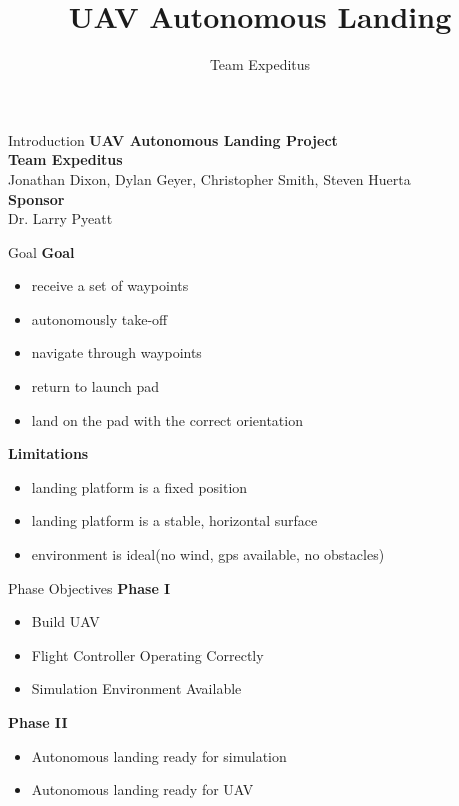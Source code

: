 \documentclass[11pt]{beamer}
\author{Team Expeditus}
\title{UAV Autonomous Landing}
\institute{Dept. of Computer Science, SDSMT}
\begin{document}
\begin{frame}
\titlepage
\end{frame}


\begin{frame}{Introduction}
\textbf{UAV Autonomous Landing Project}\\
\vspace{12mm}
\textbf{Team Expeditus}\\
Jonathan Dixon, Dylan Geyer, Christopher Smith, Steven Huerta\\ 
\vspace{6mm}
\textbf{Sponsor}\\
Dr. Larry Pyeatt\\
\end{frame}

\begin{frame}{Goal}
\textbf{Goal}\\
\begin{itemize}
\item receive a set of waypoints
\item autonomously take-off
\item navigate through waypoints
\item return to launch pad
\item land on the pad with the correct orientation
\end{itemize}
\vspace{6mm}
\textbf{Limitations}\\
\begin{itemize}
\item landing platform is a fixed position
\item landing platform is a stable, horizontal surface
\item environment is ideal(no wind, gps available, no obstacles)
\end{itemize}

\end{frame}

\begin{frame}{Phase Objectives}
\textbf{Phase I}
\begin{itemize}
\item Build UAV 
\item Flight Controller Operating Correctly
\item Simulation Environment Available
\end{itemize}
\vspace{5mm}
\textbf{Phase II}
\begin{itemize}
\item Autonomous landing ready for simulation
\item Autonomous landing ready for UAV
\end{itemize}
\end{frame}
\end{document}
